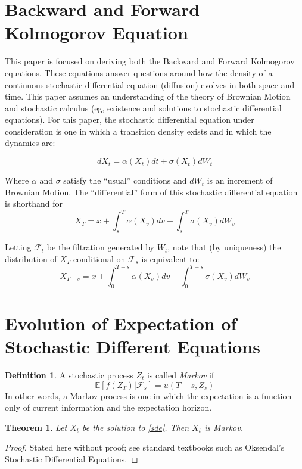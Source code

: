 \documentclass{article}
\newtheorem{theorem}{Theorem}
\theoremstyle{definition}
\newtheorem{definition}{Definition}
\begin{document}
\section{Backward and Forward Kolmogorov Equation}

This paper is focused on deriving both the Backward and Forward Kolmogorov equations.  These equations answer questions around how the density of a continuous stochastic differential equation (diffusion) evolves in both space and time.  This paper assumes an understanding of the theory of Brownian Motion and stochastic calculus (eg, existence and solutions to stochastic differential equations). For this paper, the stochastic differential equation under consideration is one in which a transition density exists and in which the dynamics are:

\begin{equation} \label{sde}
dX_t=\alpha(X_t) dt+\sigma(X_t) dW_t
\end{equation}

Where \(\alpha\) and \(\sigma\) satisfy the ``usual'' conditions and \(dW_t\) is an increment of Brownian Motion.  The ``differential'' form of this stochastic differential equation is shorthand for
\[X_T=x+\int_s^T \alpha(X_v) dv+\int_s^T\sigma(X_v) dW_v \]

Letting \(\mathcal{F}_t\) be the filtration generated by \(W_t\), note that (by uniqueness) the distribution of \(X_T\) conditional on \(\mathcal{F}_s\) is equivalent to:
\[X_{T-s}=x+\int_0^{T-s} \alpha(X_v) dv+\int_0^{T-s}\sigma(X_v) dW_v \]



\section{Evolution of Expectation of Stochastic Different Equations}

\begin{definition}
	A stochastic process \(Z_t\) is called \emph{Markov} if 
	\[\mathbb{E}[f(Z_T)|\mathcal{F}_s]=u(T-s, Z_s)\]
	In other words, a Markov process is one in which the expectation is a function only of current information and the expectation horizon.
\end{definition}

\begin{theorem}
	Let \(X_t\) be the solution to \ref{sde}.  Then \(X_t\) is Markov.  
\end{theorem}

\begin{proof}
	Stated here without proof; see standard textbooks such as Oksendal's Stochastic Differential Equations.  
\end{proof}
\end{document}
